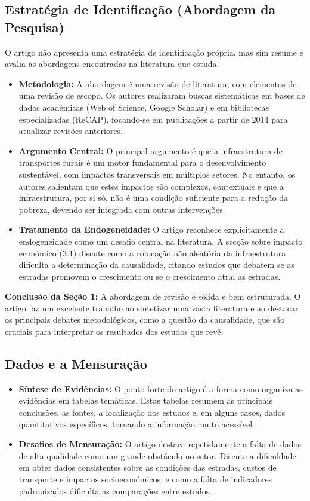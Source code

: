 \documentclass[12pt, a4paper]{article}
\begin{document}
\subsection{Estratégia de Identificação (Abordagem da Pesquisa)}
O artigo não apresenta uma estratégia de identificação própria, mas sim resume e avalia as abordagens encontradas na literatura que estuda.

\begin{itemize}
    \item \textbf{Metodologia:} A abordagem é uma revisão de literatura, com elementos de uma revisão de escopo. Os autores realizaram buscas sistemáticas em bases de dados académicas (Web of Science, Google Scholar) e em bibliotecas especializadas (ReCAP), focando-se em publicações a partir de 2014 para atualizar revisões anteriores.
    \item \textbf{Argumento Central:} O principal argumento é que a infraestrutura de transportes rurais é um motor fundamental para o desenvolvimento sustentável, com impactos transversais em múltiplos setores. No entanto, os autores salientam que estes impactos são complexos, contextuais e que a infraestrutura, por si só, não é uma condição suficiente para a redução da pobreza, devendo ser integrada com outras intervenções.
    \item \textbf{Tratamento da Endogeneidade:} O artigo reconhece explicitamente a endogeneidade como um desafio central na literatura. A secção sobre impacto económico (3.1) discute como a colocação não aleatória da infraestrutura dificulta a determinação da causalidade, citando estudos que debatem se as estradas promovem o crescimento ou se o crescimento atrai as estradas.
\end{itemize}

\noindent\textbf{Conclusão da Seção 1:} A abordagem de revisão é sólida e bem estruturada. O artigo faz um excelente trabalho ao sintetizar uma vasta literatura e ao destacar os principais debates metodológicos, como a questão da causalidade, que são cruciais para interpretar os resultados dos estudos que revê.

\subsection{Dados e a Mensuração}

\begin{itemize}
    \item \textbf{Síntese de Evidências:} O ponto forte do artigo é a forma como organiza as evidências em tabelas temáticas. Estas tabelas resumem as principais conclusões, as fontes, a localização dos estudos e, em alguns casos, dados quantitativos específicos, tornando a informação muito acessível.
    \item \textbf{Desafios de Mensuração:} O artigo destaca repetidamente a falta de dados de alta qualidade como um grande obstáculo no setor. Discute a dificuldade em obter dados consistentes sobre as condições das estradas, custos de transporte e impactos socioeconómicos, e como a falta de indicadores padronizados dificulta as comparações entre estudos.
\end{itemize}
\end{document}
